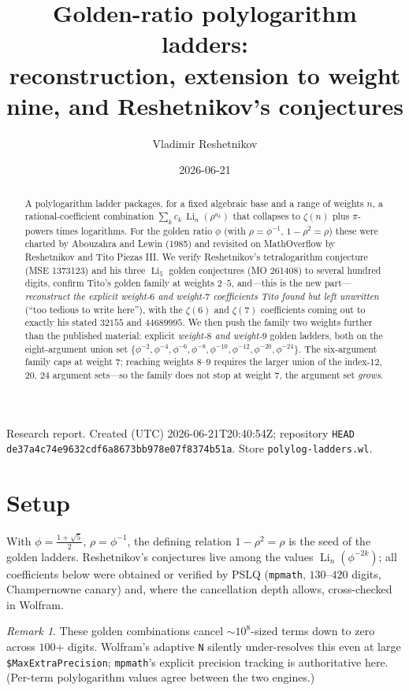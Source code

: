\documentclass[11pt]{article}
\title{Golden-ratio polylogarithm ladders:\\
reconstruction, extension to weight nine, and Reshetnikov's conjectures}
\author{Vladimir Reshetnikov}
\date{2026-06-21}
\DeclareMathOperator{\Li}{Li}
\theoremstyle{plain}\newtheorem{theorem}{Theorem}\newtheorem{proposition}[theorem]{Proposition}
\theoremstyle{remark}\newtheorem{remark}[theorem]{Remark}
\begin{document}
\maketitle
\begin{center}\small
Research report. Created (UTC) 2026-06-21T20:40:54Z; repository \texttt{HEAD}
\texttt{de37a4c74e9632cdf6a8673bb978e07f8374b51a}. Store \texttt{polylog-ladders.wl}.
\end{center}

\begin{abstract}
A polylogarithm ladder packages, for a fixed algebraic base and a range of weights $n$, a rational-coefficient
combination $\sum_k c_k\,\Li_n(\rho^{a_k})$ that collapses to $\zeta(n)$ plus $\pi$-powers times logarithms.
For the golden ratio $\phi$ (with $\rho=\phi^{-1}$, $1-\rho^2=\rho$) these were charted by Abouzahra and Lewin
(1985) and revisited on MathOverflow by Reshetnikov and Tito Piezas III. We verify Reshetnikov's tetralogarithm
conjecture (MSE 1373123) and his three $\Li_5$ golden conjectures (MO 261408) to several hundred digits,
confirm Tito's golden family at weights $2$--$5$, and---this is the new part---\emph{reconstruct the explicit
weight-$6$ and weight-$7$ coefficients Tito found but left unwritten} (``too tedious to write here''), with the
$\zeta(6)$ and $\zeta(7)$ coefficients coming out to exactly his stated $32155$ and $44689995$. We then push the
family two weights further than the published material: explicit \emph{weight-$8$ and weight-$9$} golden ladders,
both on the eight-argument union set $\{\phi^{-2},\phi^{-4},\phi^{-6},\phi^{-8},\phi^{-10},\phi^{-12},\phi^{-20},\phi^{-24}\}$.
The six-argument family caps at weight $7$; reaching weights $8$--$9$ requires the larger union of the
index-$12$, $20$, $24$ argument sets---so the family does not stop at weight $7$, the argument set \emph{grows}.
\end{abstract}

\section{Setup}
With $\phi=\tfrac{1+\sqrt5}2$, $\rho=\phi^{-1}$, the defining relation $1-\rho^2=\rho$ is the seed of the
golden ladders. Reshetnikov's conjectures live among the values $\Li_n(\phi^{-2k})$; all coefficients below were
obtained or verified by PSLQ (\texttt{mpmath}, $130$--$420$ digits, Champernowne canary) and, where the
cancellation depth allows, cross-checked in Wolfram.
\begin{remark}
These golden combinations cancel $\sim10^8$-sized terms down to zero across $100$+ digits. Wolfram's adaptive
\texttt{N} silently under-resolves this even at large \texttt{\$MaxExtraPrecision}; \texttt{mpmath}'s explicit
precision tracking is authoritative here. (Per-term polylogarithm values agree between the two engines.)
\end{remark}
\end{document}
